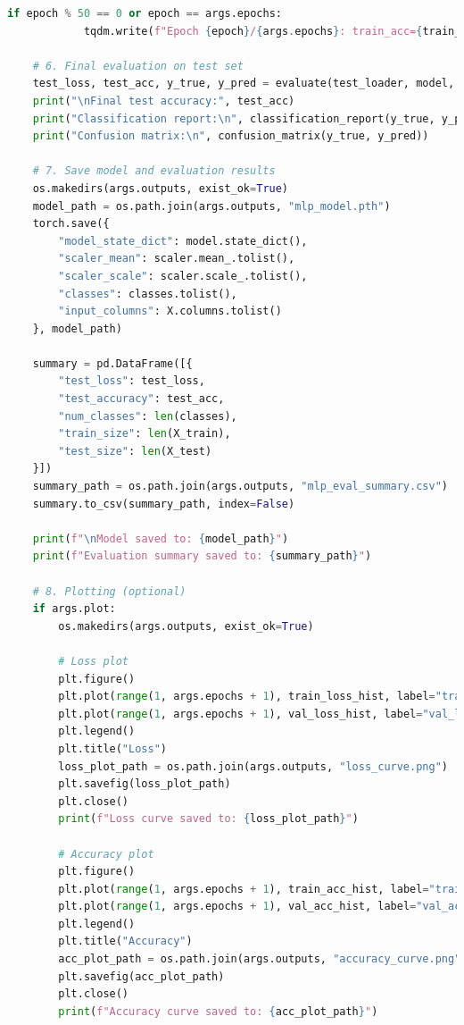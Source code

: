 \documentclass[a4paper]{CPIPC}
\numberwithin{equation}{section}
\begin{document}
\begin{lstlisting}[language=Python, caption=MLP Classifier]
        if epoch % 50 == 0 or epoch == args.epochs:
            tqdm.write(f"Epoch {epoch}/{args.epochs}: train_acc={train_acc:.4f}, val_acc={val_acc:.4f}")

    # 6. Final evaluation on test set
    test_loss, test_acc, y_true, y_pred = evaluate(test_loader, model, device, criterion)
    print("\nFinal test accuracy:", test_acc)
    print("Classification report:\n", classification_report(y_true, y_pred, target_names=classes))
    print("Confusion matrix:\n", confusion_matrix(y_true, y_pred))

    # 7. Save model and evaluation results
    os.makedirs(args.outputs, exist_ok=True)
    model_path = os.path.join(args.outputs, "mlp_model.pth")
    torch.save({
        "model_state_dict": model.state_dict(),
        "scaler_mean": scaler.mean_.tolist(),
        "scaler_scale": scaler.scale_.tolist(),
        "classes": classes.tolist(),
        "input_columns": X.columns.tolist()
    }, model_path)

    summary = pd.DataFrame([{
        "test_loss": test_loss,
        "test_accuracy": test_acc,
        "num_classes": len(classes),
        "train_size": len(X_train),
        "test_size": len(X_test)
    }])
    summary_path = os.path.join(args.outputs, "mlp_eval_summary.csv")
    summary.to_csv(summary_path, index=False)

    print(f"\nModel saved to: {model_path}")
    print(f"Evaluation summary saved to: {summary_path}")

    # 8. Plotting (optional)
    if args.plot:
        os.makedirs(args.outputs, exist_ok=True)

        # Loss plot
        plt.figure()
        plt.plot(range(1, args.epochs + 1), train_loss_hist, label="train_loss")
        plt.plot(range(1, args.epochs + 1), val_loss_hist, label="val_loss")
        plt.legend()
        plt.title("Loss")
        loss_plot_path = os.path.join(args.outputs, "loss_curve.png")
        plt.savefig(loss_plot_path)
        plt.close()
        print(f"Loss curve saved to: {loss_plot_path}")

        # Accuracy plot
        plt.figure()
        plt.plot(range(1, args.epochs + 1), train_acc_hist, label="train_acc")
        plt.plot(range(1, args.epochs + 1), val_acc_hist, label="val_acc")
        plt.legend()
        plt.title("Accuracy")
        acc_plot_path = os.path.join(args.outputs, "accuracy_curve.png")
        plt.savefig(acc_plot_path)
        plt.close()
        print(f"Accuracy curve saved to: {acc_plot_path}")




\end{lstlisting}
\end{document}
